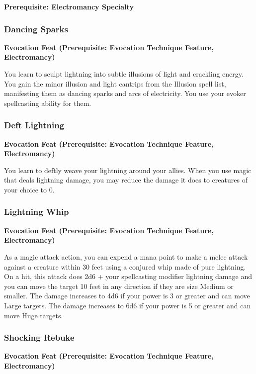\documentclass[12pt,letterpaper,twocolumn,openany,nodeprecatedcode,bg=none]{dndbook}
\begin{document}
\textbf{Prerequisite: Electromancy Specialty}

\subsubsection{Dancing Sparks}\label{dancing-sparks}

\textbf{Evocation Feat (Prerequisite: Evocation Technique Feature,
Electromancy)}

You learn to sculpt lightning into subtle illusions of light and
crackling energy. You gain the minor illusion and light cantrips from
the Illusion spell list, manifesting them as dancing sparks and arcs of
electricity. You use your evoker spellcasting ability for them.

\subsubsection{Deft Lightning}\label{deft-lightning}

\textbf{Evocation Feat (Prerequisite: Evocation Technique Feature,
Electromancy)}

You learn to deftly weave your lightning around your allies. When you
use magic that deals lightning damage, you may reduce the damage it does
to creatures of your choice to 0.

\subsubsection{Lightning Whip}\label{lightning-whip}

\textbf{Evocation Feat (Prerequisite: Evocation Technique Feature,
Electromancy)}

As a magic attack action, you can expend a mana point to make a melee
attack against a creature within 30 feet using a conjured whip made of
pure lightning. On a hit, this attack does 2d6 + your spellcasting
modifier lightning damage and you can move the target 10 feet in any
direction if they are size Medium or smaller. The damage increases to
4d6 if your power is 3 or greater and can move Large targets. The damage
increases to 6d6 if your power is 5 or greater and can move Huge
targets.

\subsubsection{Shocking Rebuke}\label{shocking-rebuke}

\textbf{Evocation Feat (Prerequisite: Evocation Technique Feature,
Electromancy)}
\end{document}
